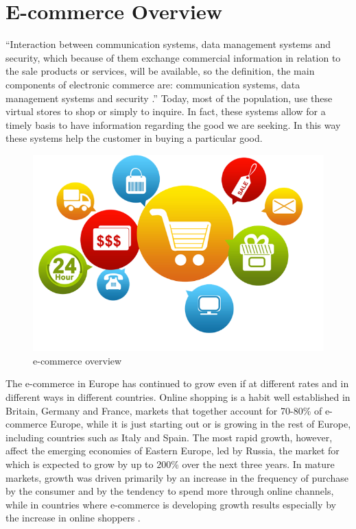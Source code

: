 \section{E-commerce Overview}
\label{sec:e_commerce_overview}
“Interaction between communication systems, data management systems and security, which because of them exchange commercial information in relation to the sale products or services, will be available, so the definition, the main components of electronic commerce are: communication systems, data management systems and security \cite{commerce_intro_1}.”
\newline
Today, most of the population, use these virtual stores to shop or simply to inquire. In fact, these systems allow for a timely basis to have information regarding the good we are seeking. In this way these systems help the customer in buying a particular good.
\newline
\begin{figure}[htb]
 \centering
 \includegraphics[width=0.8\linewidth]{images/chapter1/e-commerce.png}\hfill
 \caption[e-commerce overview]{e-commerce overview}
 \label{fig:e_commerce_overview}
\end{figure}
The e-commerce in Europe has continued to grow even if at different rates and in different ways in different countries. Online shopping is a habit well established in Britain, Germany and France, markets that together account for 70-80\% of e-commerce Europe, while it is just starting out or is growing in the rest of Europe, including countries such as Italy and Spain. The most rapid growth, however, affect the emerging economies of Eastern Europe, led by Russia, the market for which is expected to grow by up to 200\% over the next three years.
\newline
In mature markets, growth was driven primarily by an increase in the frequency of purchase by the consumer and by the tendency to spend more through online channels, while in countries where e-commerce is developing growth results especially by the increase in online shoppers \cite{e_commerce_in_italy}.
